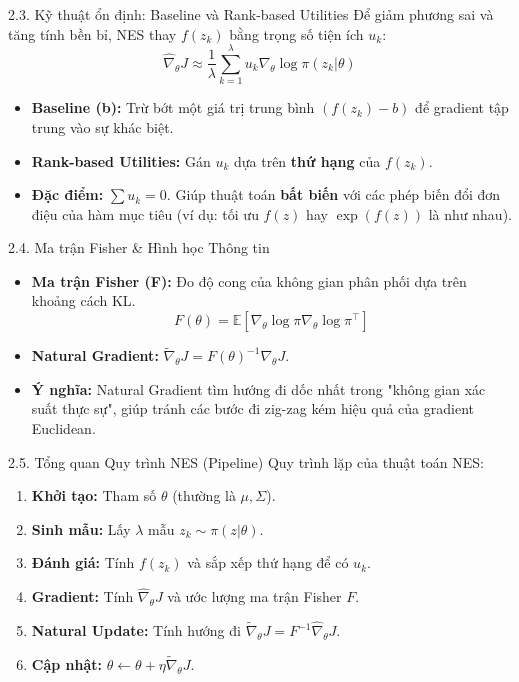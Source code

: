\documentclass[10pt,xcolor=dvipsnames]{beamer}
\newcommand{\E}{\mathbb{E}}
\begin{document}
	\begin{frame}{2.3. Kỹ thuật ổn định: Baseline và Rank-based Utilities}
		Để giảm phương sai và tăng tính bền bỉ, NES thay $f(z_k)$ bằng trọng số tiện ích $u_k$:
		\[ \hat{\nabla}_\theta J \approx \frac{1}{\lambda} \sum_{k=1}^{\lambda} u_k \nabla_\theta \log \pi(z_k|\theta) \]
		\begin{itemize}
			\item \textbf{Baseline (b):} Trừ bớt một giá trị trung bình $(f(z_k) - b)$ để gradient tập trung vào sự khác biệt.
			\item \textbf{Rank-based Utilities:} Gán $u_k$ dựa trên \textbf{thứ hạng} của $f(z_k)$.
			\item \textbf{Đặc điểm:} $\sum u_k = 0$. Giúp thuật toán \textbf{bất biến} với các phép biến đổi đơn điệu của hàm mục tiêu (ví dụ: tối ưu $f(z)$ hay $\exp(f(z))$ là như nhau).
		\end{itemize}
	\end{frame}
	
	\begin{frame}{2.4. Ma trận Fisher \& Hình học Thông tin}
		
		\begin{itemize}
			\item \textbf{Ma trận Fisher (F):} Đo độ cong của không gian phân phối dựa trên khoảng cách KL.
			\[ F(\theta) = \E [\nabla_\theta \log \pi \nabla_\theta \log \pi^\top] \]
			\item \textbf{Natural Gradient:} $\tilde{\nabla}_\theta J = F(\theta)^{-1} \nabla_\theta J$.
			\item \textbf{Ý nghĩa:} Natural Gradient tìm hướng đi dốc nhất trong "không gian xác suất thực sự", giúp tránh các bước đi zig-zag kém hiệu quả của gradient Euclidean.
		\end{itemize}
	\end{frame}
	
	\begin{frame}{2.5. Tổng quan Quy trình NES (Pipeline)}
		Quy trình lặp của thuật toán NES:
		\begin{enumerate}
			\item \textbf{Khởi tạo:} Tham số $\theta$ (thường là $\mu, \Sigma$).
			\item \textbf{Sinh mẫu:} Lấy $\lambda$ mẫu $z_k \sim \pi(z|\theta)$.
			\item \textbf{Đánh giá:} Tính $f(z_k)$ và sắp xếp thứ hạng để có $u_k$.
			\item \textbf{Gradient:} Tính $\hat{\nabla}_\theta J$ và ước lượng ma trận Fisher $F$.
			\item \textbf{Natural Update:} Tính hướng đi $\tilde{\nabla}_\theta J = F^{-1} \hat{\nabla}_\theta J$.
			\item \textbf{Cập nhật:} $\theta \leftarrow \theta + \eta \tilde{\nabla}_\theta J$.
		\end{enumerate}
	\end{frame}
	
\end{document}
